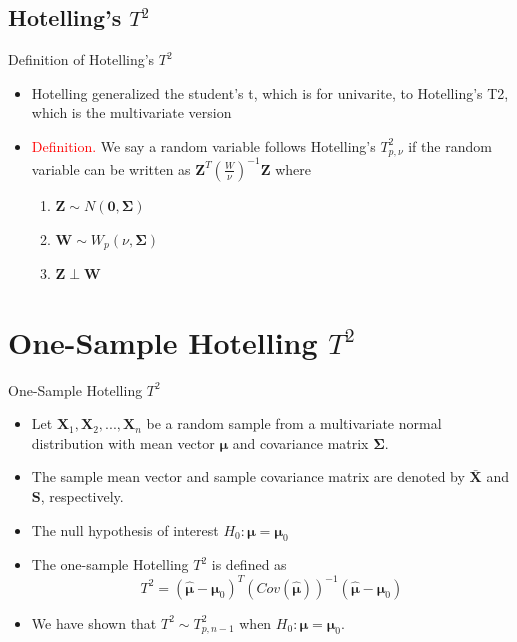 \documentclass[
  ignorenonframetext,
]{beamer}
\providecommand{\tightlist}{%
  \setlength{\itemsep}{0pt}\setlength{\parskip}{0pt}}
\begin{document}
\hypertarget{hotellings-t2}{%
\subsection{\texorpdfstring{Hotelling's
\(T^2\)}{Hotelling's T\^{}2}}\label{hotellings-t2}}

\begin{frame}{Definition of Hotelling's \(T^2\)}
\protect\hypertarget{definition-of-hotellings-t2}{}
\begin{itemize}
\tightlist
\item
  Hotelling generalized the student's t, which is for univarite, to
  Hotelling's T2, which is the multivariate version
\item
  \textcolor{red}{Definition. }We say a random variable follows
  Hotelling's \(T_{p,\nu}^2\) if the random variable can be written as
  \(\mathbf Z^T\left(\frac{W}{\nu}\right)^{-1}\mathbf Z\) where

  \begin{enumerate}
  \tightlist
  \item
    \(\mathbf Z\sim N(\mathbf 0, \boldsymbol\Sigma)\)
  \item
    \(\mathbf W \sim W_p(\nu, \boldsymbol\Sigma)\)
  \item
    \(\mathbf Z \perp \mathbf W\)
  \end{enumerate}
\end{itemize}
\end{frame}

\hypertarget{one-sample-hotelling-t2}{%
\section{\texorpdfstring{One-Sample Hotelling
\(T^2\)}{One-Sample Hotelling T\^{}2}}\label{one-sample-hotelling-t2}}

\begin{frame}{One-Sample Hotelling \(T^2\)}
\protect\hypertarget{one-sample-hotelling-t2-1}{}
\begin{itemize}
\item
  Let \(\boldsymbol{X}_1, \boldsymbol{X}_2, ..., \boldsymbol{X}_n\) be a
  random sample from a multivariate normal distribution with mean vector
  \(\boldsymbol{\mu}\) and covariance matrix \(\boldsymbol{\Sigma}\).
\item
  The sample mean vector and sample covariance matrix are denoted by
  \(\bar{\mathbf X}\) and \(\mathbf S\), respectively.
\item
  The null hypothesis of interest
  \(H_0: \boldsymbol \mu = \boldsymbol \mu_0\)
\item
  The one-sample Hotelling \(T^2\) is defined as
  \[T^2=(\hat{\mathbf \mu} - \mathbf \mu_0)^T \left(Cov(\hat{\mathbf \mu})\right)^{-1}(\hat{\mathbf \mu} - \mathbf \mu_0)\]
\item
  We have shown that \(T^2\sim T_{p, n-1}^2\) when
  \(H_0: \boldsymbol \mu=\boldsymbol \mu_0\).
\end{itemize}
\end{frame}
\end{document}
